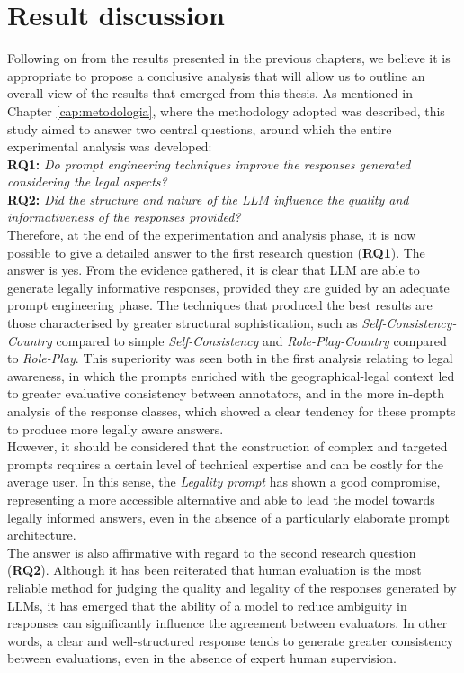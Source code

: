 \section{Result discussion}
Following on from the results presented in the previous chapters, we believe it is appropriate to propose a conclusive analysis that will allow us to outline an overall view of the results that emerged from this thesis.
As mentioned in Chapter \ref{cap:metodologia}, where the methodology adopted was described, this study aimed to answer two central questions, around which the entire experimental analysis was developed:\\
\textbf{RQ1: }\textit{Do prompt engineering techniques improve the responses generated considering the legal aspects?}\\
\textbf{RQ2: }\textit{Did the structure and nature of the LLM influence the quality and informativeness of the responses provided?}\\
Therefore, at the end of the experimentation and analysis phase, it is now possible to give a detailed answer to the first research question (\textbf{RQ1}). The answer is yes.
From the evidence gathered, it is clear that LLM are able to generate legally informative responses, provided they are guided by an adequate prompt engineering phase.
The techniques that produced the best results are those characterised by greater structural sophistication, such as \textit{Self-Consistency-Country} compared to simple \textit{Self-Consistency} and \textit{Role-Play-Country} compared to \textit{Role-Play}.
This superiority was seen both in the first analysis relating to legal awareness, in which the prompts enriched with the geographical-legal context led to greater evaluative consistency between annotators, and in the more in-depth analysis of the response classes, which showed a clear tendency for these prompts to produce more legally aware answers.\\
However, it should be considered that the construction of complex and targeted prompts requires a certain level of technical expertise and can be costly for the average user. In this sense, the \textit{Legality prompt} has shown a good compromise, representing a more accessible alternative and able to lead the model towards legally informed answers, even in the absence of a particularly elaborate prompt architecture.
\\
The answer is also affirmative with regard to the second research question (\textbf{RQ2}).
Although it has been reiterated that human evaluation is the most reliable method for judging the quality and legality of the responses generated by LLMs, it has emerged that the ability of a model to reduce ambiguity in responses can significantly influence the agreement between evaluators. In other words, a clear and well-structured response tends to generate greater consistency between evaluations, even in the absence of expert human supervision.
